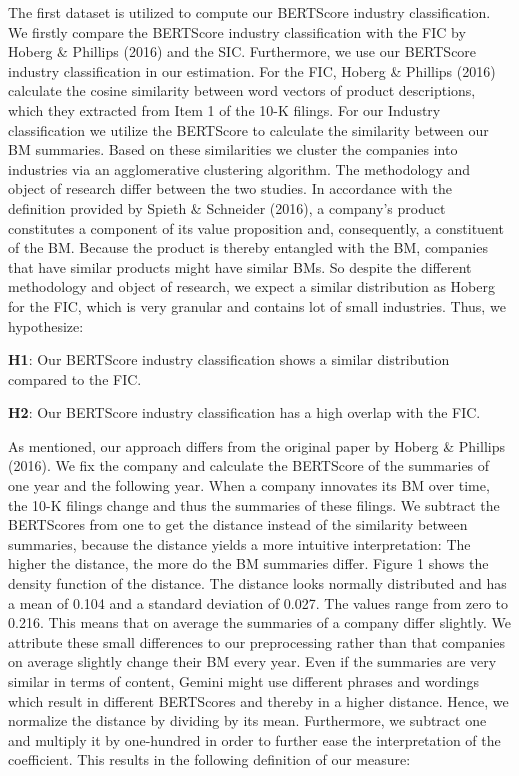 \documentclass[
]{article}
\begin{document}
The first dataset is utilized to compute our BERTScore industry
classification. We firstly compare the BERTScore industry classification
with the FIC by Hoberg \& Phillips (2016) and the SIC. Furthermore, we
use our BERTScore industry classification in our estimation. For the
FIC, Hoberg \& Phillips (2016) calculate the cosine similarity between
word vectors of product descriptions, which they extracted from Item 1
of the 10-K filings. For our Industry classification we utilize the
BERTScore to calculate the similarity between our BM summaries. Based on
these similarities we cluster the companies into industries via an
agglomerative clustering algorithm. The methodology and object of
research differ between the two studies. In accordance with the
definition provided by Spieth \& Schneider (2016), a company's product
constitutes a component of its value proposition and, consequently, a
constituent of the BM. Because the product is thereby entangled with the
BM, companies that have similar products might have similar BMs. So
despite the different methodology and object of research, we expect a
similar distribution as Hoberg for the FIC, which is very granular and
contains lot of small industries. Thus, we hypothesize:

\textbf{H1}: Our BERTScore industry classification shows a similar
distribution compared to the FIC.

\textbf{H2}: Our BERTScore industry classification has a high overlap
with the FIC.

As mentioned, our approach differs from the original paper by Hoberg \&
Phillips (2016). We fix the company and calculate the BERTScore of the
summaries of one year and the following year. When a company innovates
its BM over time, the 10-K filings change and thus the summaries of
these filings. We subtract the BERTScores from one to get the distance
instead of the similarity between summaries, because the distance yields
a more intuitive interpretation: The higher the distance, the more do
the BM summaries differ. Figure 1 shows the density function of the
distance. The distance looks normally distributed and has a mean of
0.104 and a standard deviation of 0.027. The values range from zero to
0.216. This means that on average the summaries of a company differ
slightly. We attribute these small differences to our preprocessing
rather than that companies on average slightly change their BM every
year. Even if the summaries are very similar in terms of content, Gemini
might use different phrases and wordings which result in different
BERTScores and thereby in a higher distance. Hence, we normalize the
distance by dividing by its mean. Furthermore, we subtract one and
multiply it by one-hundred in order to further ease the interpretation
of the coefficient. This results in the following definition of our
measure:
\end{document}
